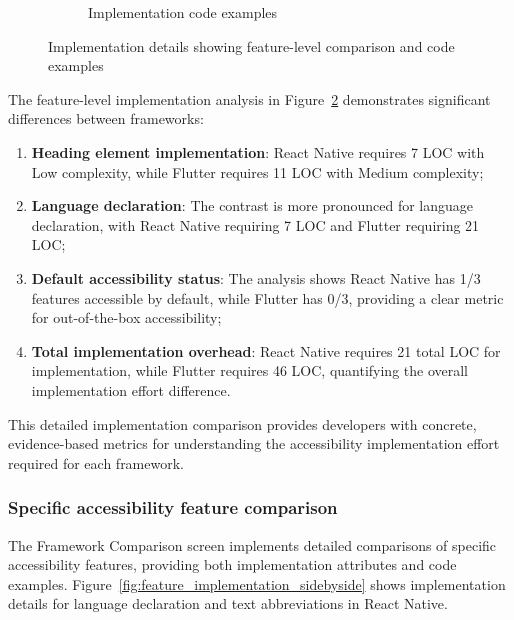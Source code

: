 \begin{figure}[ht]
\begin{subfigure}[b]{0.48\textwidth}
        \caption{Implementation code examples}
        \label{fig:implementation-code-examples}
    \end{subfigure}
    \caption{Implementation details showing feature-level comparison and code examples}
    \label{fig:implementation_details}
\end{figure}

The feature-level implementation analysis in Figure~\ref{fig:implementation_details} demonstrates significant differences between frameworks:

\begin{enumerate}
    \item \textbf{Heading element implementation}: React Native requires 7 LOC with Low complexity, while Flutter requires 11 LOC with Medium complexity;
    
    \item \textbf{Language declaration}: The contrast is more pronounced for language declaration, with React Native requiring 7 LOC and Flutter requiring 21 LOC;
    
    \item \textbf{Default accessibility status}: The analysis shows React Native has 1/3 features accessible by default, while Flutter has 0/3, providing a clear metric for out-of-the-box accessibility;
    
    \item \textbf{Total implementation overhead}: React Native requires 21 total LOC for implementation, while Flutter requires 46 LOC, quantifying the overall implementation effort difference.
\end{enumerate}

This detailed implementation comparison provides developers with concrete, evidence-based metrics for understanding the accessibility implementation effort required for each framework.

\subsubsection{Specific accessibility feature comparison}

The Framework Comparison screen implements detailed comparisons of specific accessibility features, providing both implementation attributes and code examples. Figure~\ref{fig:feature_implementation_sidebyside} shows implementation details for language declaration and text abbreviations in React Native.

